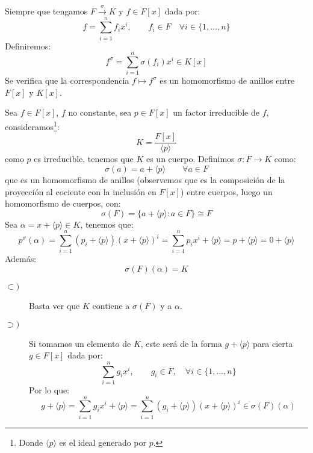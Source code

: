 \begin{definicion}
    Siempre que tengamos $F\stackrel{\sigma}{\to} K$ y $f\in F[x]$ dada por:
\begin{equation*}
    f = \sum_{i=1}^{n} f_i x^i, \qquad f_i \in F \quad \forall i \in \{1,\ldots,n\}
\end{equation*}
Definiremos:
\begin{equation*}
    f^\sigma = \sum_{i=1}^{n} \sigma(f_i) x^i \in K[x]
\end{equation*}
Se verifica que la correspondencia $f\mapsto f^\sigma$ es un homomorfismo de anillos entre $F[x]$ y $K[x]$.
\end{definicion}

\begin{ejemplo}
    Sea $f\in F[x]$, $f$ no constante, sea $p\in F[x]$ un factor irreducible de $f$, consideramos\footnote{Donde $\langle p \rangle $ es el ideal generado por $p$.}:
    \begin{equation*}
        K = \dfrac{F[x]}{\langle p \rangle }
    \end{equation*}
    como $p$ es irreducible, tenemos que $K$ es un cuerpo. Definimos $\sigma:F\to K$ como:
    \begin{equation*}
        \sigma(a) = a + \langle p \rangle  \qquad \forall a\in F
    \end{equation*}
    que es un homomorfismo de anillos (observemos que es la composición de la proyección al cociente con la inclusión en $F[x]$) entre cuerpos, luego un homomorfismo de cuerpos, con:
    \begin{equation*}
        \sigma(F) = \{a+\langle p \rangle : a\in F\} \cong F
    \end{equation*}
    Sea $\alpha = x+\langle p \rangle \in K$, tenemos que:
    \begin{equation*}
        p^\sigma(\alpha) = \sum_{i=1}^{n} (p_i + \langle p \rangle){(x+\langle p \rangle )}^{i} = \sum_{i=1}^{n} p_ix^i + \langle p \rangle  = p + \langle p \rangle  = 0 + \langle p \rangle 
    \end{equation*}
    Además:
    \begin{equation*}
        \sigma(F)(\alpha) = K
    \end{equation*}
    \begin{description}
        \item [$\subset )$] Basta ver que $K$ contiene a $\sigma(F)$ y a $\alpha$.
        \item [$\supset )$] Si tomamos un elemento de $K$, este será de la forma $g+\langle p \rangle $ para cierta $g\in F[x]$ dada por:
            \begin{equation*}
                \sum_{i=1}^{n}g_ix^i, \qquad g_i \in F, \quad \forall i \in \{1,\ldots,n\}
            \end{equation*}
            Por lo que:
            \begin{equation*}
                g+\langle p \rangle  = \sum_{i=1}^{n}g_ix^i + \langle p \rangle  = \sum_{i=1}^{n}(g_i+\langle p \rangle ){(x+\langle p \rangle )}^{i} \in \sigma(F)(\alpha)
            \end{equation*}
    \end{description}
\end{ejemplo}

